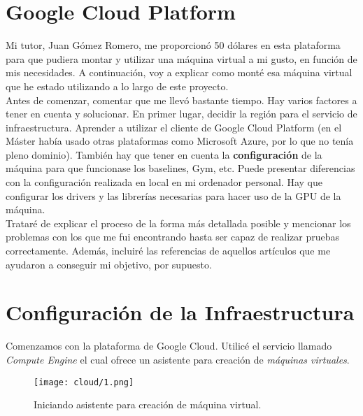 \documentclass[11pt,fleqn]{book} %
\begin{document}
\section{Google Cloud Platform}\label{sec:googlecloud}

Mi tutor, Juan Gómez Romero, me proporcionó 50 dólares en esta plataforma para que pudiera montar y utilizar una máquina virtual a mi gusto, en función de mis necesidades. A continuación, voy a explicar como monté esa máquina virtual que he estado utilizando a lo largo de este proyecto. \\

Antes de comenzar, comentar que me llevó bastante tiempo. Hay varios factores a tener en cuenta y solucionar. En primer lugar, decidir la región para el servicio de infraestructura. Aprender a utilizar el cliente de Google Cloud Platform (en el Máster había usado otras plataformas como Microsoft Azure, por lo que no tenía pleno dominio). También hay que tener en cuenta la \textbf{configuración} de la máquina para que funcionase los baselines, Gym, etc. Puede presentar diferencias con la configuración realizada en local en mi ordenador personal. Hay que configurar los drivers y las librerías necesarias para hacer uso de la GPU de la máquina. \\

Trataré de explicar el proceso de la forma más detallada posible y mencionar los problemas con los que me fui encontrando hasta ser capaz de realizar pruebas correctamente. Además, incluiré las referencias de aquellos artículos que me ayudaron a conseguir mi objetivo, por supuesto. \\

\section{Configuración de la Infraestructura}\label{sec:infraestructura}

Comenzamos con la plataforma de Google Cloud. Utilicé el servicio llamado \textit{Compute Engine} el cual ofrece un asistente para creación de \textit{máquinas virtuales}. \\

\begin{figure}[H]
	\centering\texttt{[image: cloud/1.png]}
	\caption{Iniciando asistente para creación de máquina virtual.}
	\label{fig:cloud1} %
\end{figure}
\end{document}
